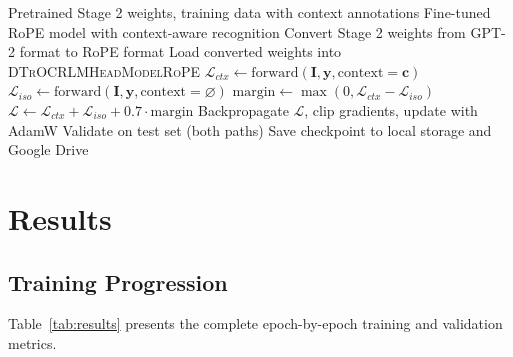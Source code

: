 \documentclass[11pt, a4paper]{article}
\begin{document}
\begin{algorithm}[h]
\caption{Stage 3 Dual-Path Training Loop}
\label{alg:training}
\begin{algorithmic}[1]
\Require Pretrained Stage 2 weights, training data with context annotations
\Ensure Fine-tuned RoPE model with context-aware recognition
\State Convert Stage 2 weights from GPT-2 format to RoPE format
\State Load converted weights into \textsc{DTrOCRLMHeadModelRoPE}
        \State $\mathcal{L}_{ctx} \gets \text{forward}(\mathbf{I}, \mathbf{y}, \text{context}=\mathbf{c})$ 
        \State $\mathcal{L}_{iso} \gets \text{forward}(\mathbf{I}, \mathbf{y}, \text{context}=\varnothing)$ 
        \State $\text{margin} \gets \max(0, \mathcal{L}_{ctx} - \mathcal{L}_{iso})$
        \State $\mathcal{L} \gets \mathcal{L}_{ctx} + \mathcal{L}_{iso} + 0.7 \cdot \text{margin}$
        \State Backpropagate $\mathcal{L}$, clip gradients, update with AdamW
    \EndFor
    \State Validate on test set (both paths)
    \State Save checkpoint to local storage and Google Drive
\EndFor
\end{algorithmic}
\end{algorithm}

\section{Results}

\subsection{Training Progression}

Table~\ref{tab:results} presents the complete epoch-by-epoch training and validation metrics.
\end{document}
